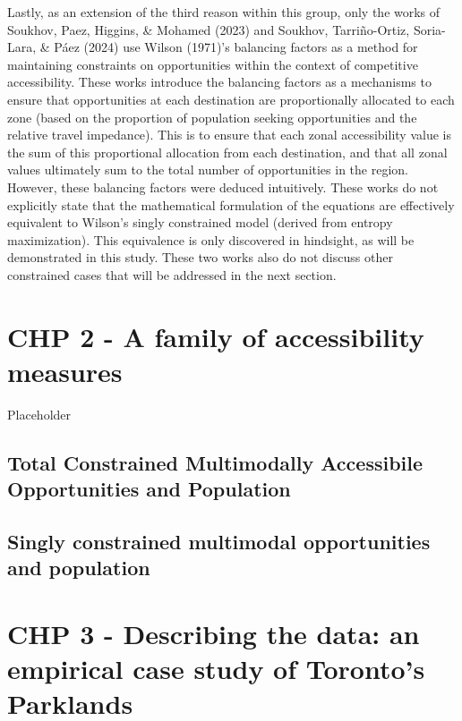 \documentclass[
11pt, %
oneside, %
english, %
singlespacing, %
]{macthesis} %
\begin{document}
Lastly, as an extension of the third reason within this group, only the works of Soukhov, Paez, Higgins, \& Mohamed (2023) and Soukhov, Tarriño-Ortiz, Soria-Lara, \& Páez (2024) use Wilson (1971)'s balancing factors as a method for maintaining constraints on opportunities within the context of competitive accessibility. These works introduce the balancing factors as a mechanisms to ensure that opportunities at each destination are proportionally allocated to each zone (based on the proportion of population seeking opportunities and the relative travel impedance). This is to ensure that each zonal accessibility value is the sum of this proportional allocation from each destination, and that all zonal values ultimately sum to the total number of opportunities in the region. However, these balancing factors were deduced intuitively. These works do not explicitly state that the mathematical formulation of the equations are effectively equivalent to Wilson's singly constrained model (derived from entropy maximization). This equivalence is only discovered in hindsight, as will be demonstrated in this study. These two works also do not discuss other constrained cases that will be addressed in the next section.

\chapter{CHP 2 - A family of accessibility measures}\label{chp-2---a-family-of-accessibility-measures}

Placeholder

\section{Total Constrained Multimodally Accessibile Opportunities and Population}\label{total-constrained-multimodally-accessibile-opportunities-and-population}

\section{Singly constrained multimodal opportunities and population}\label{singly-constrained-multimodal-opportunities-and-population}

\chapter{CHP 3 - Describing the data: an empirical case study of Toronto's Parklands}\label{chp-3---describing-the-data-an-empirical-case-study-of-torontos-parklands}
\end{document}
